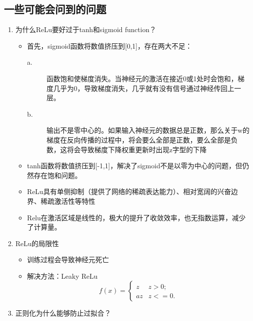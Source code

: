 \documentclass[UTF8]{article}%
\begin{document}
	\subsection{一些可能会问到的问题}
	\par
	\begin{enumerate}
		
		\item 为什么ReLu要好过于tanh和sigmoid function？
			\begin{itemize}
				\item 首先，sigmoid函数将数值挤压到[0,1]，存在两大不足：
					\begin{description}
						\item[a.] 函数饱和使梯度消失。当神经元的激活在接近0或1处时会饱和，梯度几乎为0，导致梯度消失，几乎就有没有信号通过神经传回上一层。
						\item[b.] 输出不是零中心的。如果输入神经元的数据总是正数，那么关于w的梯度在反向传播的过程中，将会要么全部是正数，要么全部是负数，这将会导致梯度下降权重更新时出现z字型的下降				
					\end{description}
				\item tanh函数将数值挤压到[-1,1]，解决了sigmoid不是以零为中心的问题，但仍然存在饱和问题。
				\item ReLu具有单侧抑制（提供了网络的稀疏表达能力）、相对宽阔的兴奋边界、稀疏激活性等特性 
				\item Relu在激活区域是线性的，极大的提升了收敛效率，也无指数运算，减少了计算量。
			\end{itemize}
		\item ReLu的局限性
			\begin{itemize}
				\item 训练过程会导致神经元死亡
				\item 解决方法：Leaky ReLu
				\begin{equation} 
				f(x)=\begin{cases} 
				z   & z>0; \\ 
				az & z<=0.
				\end{cases} 
				\end{equation} \label{3}
			\end{itemize}
		\item 正则化为什么能够防止过拟合？
\end{enumerate}
\end{document}
